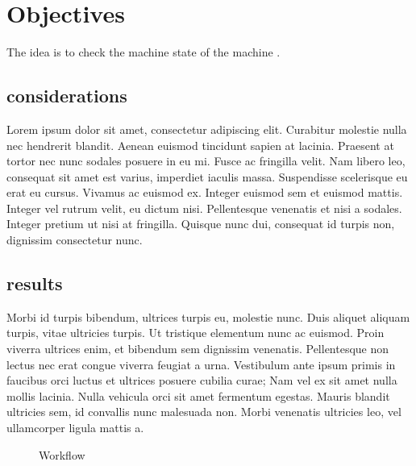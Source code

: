 \section{Objectives}

The idea is to check the machine state of the machine \textbf{\productToTestName}.

\subsection{considerations}
Lorem ipsum dolor sit amet, consectetur adipiscing elit. Curabitur molestie nulla nec hendrerit
blandit. Aenean euismod tincidunt sapien at lacinia. Praesent at tortor nec nunc sodales posuere in
eu mi. Fusce ac fringilla velit. Nam libero leo, consequat sit amet est varius, imperdiet iaculis
massa. Suspendisse scelerisque eu erat eu cursus. Vivamus ac euismod ex. Integer euismod sem et 
euismod mattis. Integer vel rutrum velit, eu dictum nisi. Pellentesque venenatis et nisi a sodales.
Integer pretium ut nisi at fringilla. Quisque nunc dui, consequat id turpis non, dignissim 
consectetur nunc.

\subsection{results}
Morbi id turpis bibendum, ultrices turpis eu, molestie nunc. Duis aliquet aliquam turpis, vitae
ultricies turpis. Ut tristique elementum nunc ac euismod. Proin viverra ultrices enim, et bibendum
sem dignissim venenatis. Pellentesque non lectus nec erat congue viverra feugiat a urna. Vestibulum
ante ipsum primis in faucibus orci luctus et ultrices posuere cubilia curae; Nam vel ex sit amet
nulla mollis lacinia. Nulla vehicula orci sit amet fermentum egestas. Mauris blandit ultricies sem,
id convallis nunc malesuada non. Morbi venenatis ultricies leo, vel ullamcorper ligula mattis a.

\vspace{0.3cm}

\begin{figure}[h]
    \begin{center}
    \end{center}
    \caption{Workflow}
\end{figure}

\clearpage